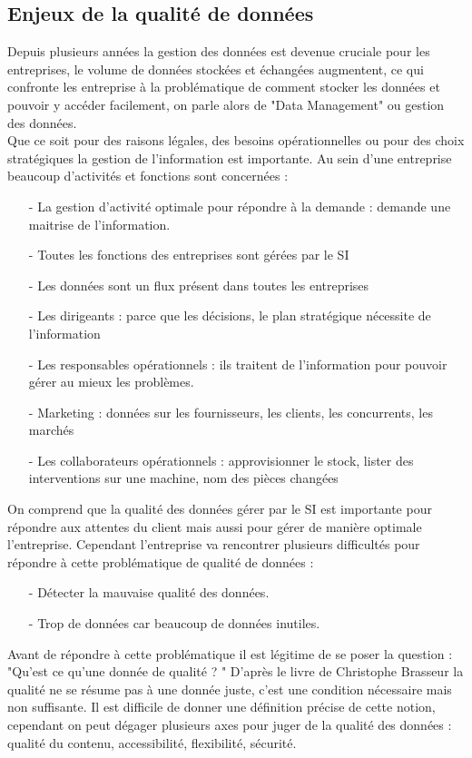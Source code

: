 \subsection {Enjeux de la qualité de données}
Depuis plusieurs années la gestion des données est devenue cruciale pour les entreprises, le volume de données stockées et échangées augmentent, ce qui confronte les entreprise à la problématique de comment stocker les données et pouvoir y accéder facilement, on parle alors de  "Data Management" ou gestion des données.\\ Que ce soit pour des raisons légales, des besoins opérationnelles ou pour des choix stratégiques la gestion de l'information est importante.  Au sein d'une entreprise beaucoup d'activités et fonctions sont concernées :
\begin{itemize}
\item[-] La gestion d’activité optimale pour répondre à la demande : demande une maitrise de l’information.
\item[-] Toutes les fonctions des entreprises sont gérées par le SI
\item[-] Les données sont un flux présent dans toutes les entreprises
\item[-] Les dirigeants : parce que les décisions, le plan stratégique nécessite de l’information
\item[-] Les responsables opérationnels : ils traitent de l’information pour pouvoir gérer au mieux les problèmes. 
\item[-] Marketing : données sur les fournisseurs, les clients, les concurrents, les marchés
\item[-] Les collaborateurs opérationnels : approvisionner le stock, lister des interventions sur une machine, nom des pièces changées
\end{itemize}
On comprend que la qualité des données gérer par le SI est importante pour répondre aux attentes du client mais aussi pour gérer de manière optimale l'entreprise. Cependant l'entreprise va rencontrer plusieurs difficultés pour répondre à cette problématique de  qualité de données : 
\begin{itemize}
\item[-]Détecter la mauvaise qualité des données.
\item[-]Trop de données car beaucoup de données inutiles. 
\end{itemize}
Avant de répondre à cette problématique il est légitime de se poser la question : "Qu'est ce qu'une donnée de qualité ? "
D'après le livre de Christophe Brasseur \cite{Brasseur} la qualité ne se résume pas à une donnée juste, c'est une condition nécessaire mais non suffisante. Il est difficile de donner une définition précise de cette notion, cependant on peut dégager plusieurs axes pour juger de la qualité des données : qualité du contenu, accessibilité, flexibilité, sécurité.
